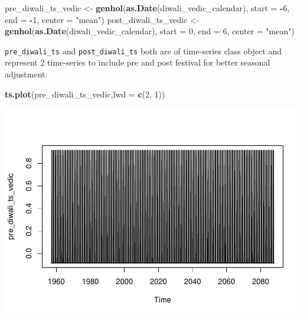 \documentclass[
]{article}
\newenvironment{Shaded}{\begin{snugshade}}{\end{snugshade}}
\newcommand{\AttributeTok}[1]{\textcolor[rgb]{0.13,0.29,0.53}{#1}}
\newcommand{\DecValTok}[1]{\textcolor[rgb]{0.00,0.00,0.81}{#1}}
\newcommand{\FunctionTok}[1]{\textcolor[rgb]{0.13,0.29,0.53}{\textbf{#1}}}
\newcommand{\NormalTok}[1]{#1}
\newcommand{\OtherTok}[1]{\textcolor[rgb]{0.56,0.35,0.01}{#1}}
\newcommand{\SpecialCharTok}[1]{\textcolor[rgb]{0.81,0.36,0.00}{\textbf{#1}}}
\newcommand{\StringTok}[1]{\textcolor[rgb]{0.31,0.60,0.02}{#1}}
\begin{document}
\begin{Shaded}
\begin{Highlighting}[]
\NormalTok{pre\_diwali\_ts\_vedic }\OtherTok{\textless{}{-}} \FunctionTok{genhol}\NormalTok{(}\FunctionTok{as.Date}\NormalTok{(diwali\_vedic\_calendar), }\AttributeTok{start =} \SpecialCharTok{{-}}\DecValTok{6}\NormalTok{, }\AttributeTok{end =} \SpecialCharTok{{-}}\DecValTok{1}\NormalTok{, }\AttributeTok{center =} \StringTok{"mean"}\NormalTok{)}
\NormalTok{post\_diwali\_ts\_vedic }\OtherTok{\textless{}{-}} \FunctionTok{genhol}\NormalTok{(}\FunctionTok{as.Date}\NormalTok{(diwali\_vedic\_calendar), }\AttributeTok{start =} \DecValTok{0}\NormalTok{, }\AttributeTok{end =} \DecValTok{6}\NormalTok{, }\AttributeTok{center =} \StringTok{"mean"}\NormalTok{)}
\end{Highlighting}
\end{Shaded}

\texttt{pre\_diwali\_ts} and \texttt{post\_diwali\_ts} both are of
time-series class object and represent 2 time-series to include pre and
post festival for better seasonal adjustment.

\begin{Shaded}
\begin{Highlighting}[]
\FunctionTok{ts.plot}\NormalTok{(pre\_diwali\_ts\_vedic,}\AttributeTok{lwd =} \FunctionTok{c}\NormalTok{(}\DecValTok{2}\NormalTok{, }\DecValTok{1}\NormalTok{))}
\end{Highlighting}
\end{Shaded}

\includegraphics{regressors_of_diwali_seasonality_for_industrial_production_files/figure-latex/unnamed-chunk-6-1.pdf}
\end{document}

